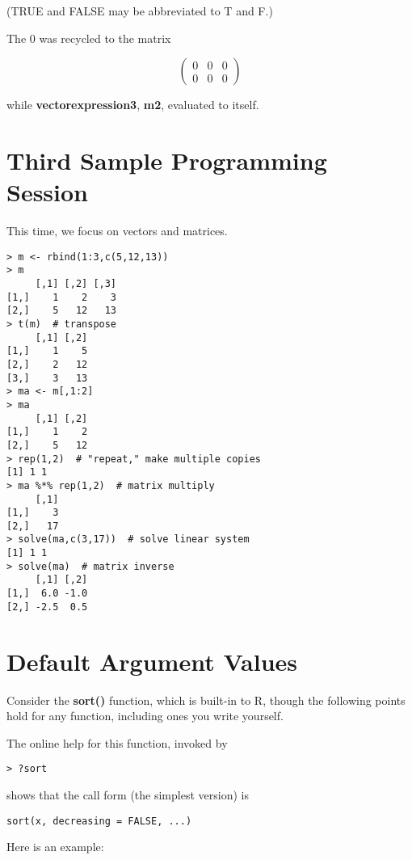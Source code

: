 (TRUE and FALSE may be abbreviated to T and F.)

The 0 was recycled to the matrix

\begin{equation}
\left (
\begin{array}{rrr}
0 & 0 & 0 \\
0 & 0 & 0
\end{array}
\right )
\end{equation}

while {\bf vectorexpression3}, {\bf m2}, evaluated to itself.

\section{Third Sample Programming Session}

This time, we focus on vectors and matrices.

\begin{lstlisting}
> m <- rbind(1:3,c(5,12,13))  
> m
     [,1] [,2] [,3]
[1,]    1    2    3
[2,]    5   12   13
> t(m)  # transpose
     [,1] [,2]
[1,]    1    5
[2,]    2   12
[3,]    3   13
> ma <- m[,1:2]
> ma
     [,1] [,2]
[1,]    1    2
[2,]    5   12
> rep(1,2)  # "repeat," make multiple copies
[1] 1 1
> ma %*% rep(1,2)  # matrix multiply
     [,1]
[1,]    3
[2,]   17
> solve(ma,c(3,17))  # solve linear system
[1] 1 1
> solve(ma)  # matrix inverse
     [,1] [,2]
[1,]  6.0 -1.0
[2,] -2.5  0.5
\end{lstlisting}

\section{Default Argument Values}

Consider the {\bf sort()} function, which is built-in to R, though the
following points hold for any function, including ones you write
yourself.

The online help for this function, invoked by

\begin{lstlisting}
> ?sort
\end{lstlisting}

shows that the call form (the simplest version) is

\begin{lstlisting}
sort(x, decreasing = FALSE, ...)
\end{lstlisting}

Here is an example:

